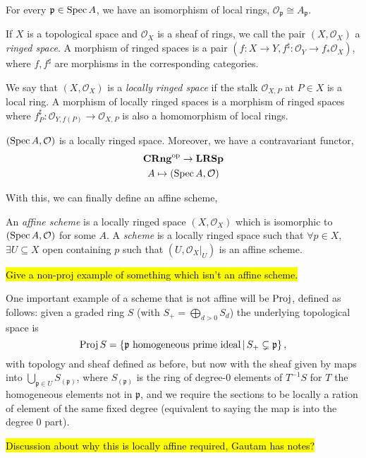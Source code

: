 \documentclass[000-main.tex]{subfiles}
\begin{document}
\begin{lemma}
  For every $\mathfrak{p}\in\operatorname{Spec} A$, we have an isomorphism of local rings, $\mathcal{O}_{\mathfrak{p}} \cong A_\mathfrak{p}$.
\end{lemma}

\begin{definition}
  If $X$ is a topological space and $\mathcal{O}_X$ is a sheaf of rings, we call the pair $(X, \mathcal{O}_X)$ a \emph{ringed space}.
  A morphism of ringed spaces is a pair $(f : X \to Y, f^\sharp : \mathcal{O}_Y \to f_\ast \mathcal{O}_X)$, where $f, f^\sharp$ are morphisms in the corresponding categories.
	
	We say that $(X, \mathcal{O}_X)$ is a \emph{locally ringed space} if the stalk $\mathcal{O}_{X, P}$ at $P \in X$ is a local ring.
  A morphism of locally ringed spaces is a morphism of ringed spaces where $f^\sharp_P : \mathcal{O}_{Y, f(P)} \to \mathcal{O}_{X, P}$ is also a homomorphism of local rings.
\end{definition}

\begin{example}
  $(\operatorname{Spec} A, \mathcal{O})$ is a locally ringed space.
  Moreover, we have a contravariant functor,
  \begin{displaymath}
    \begin{gathered}
      \mathbf{CRng}^{\text{op}} \to \mathbf{LRSp}\\
      A \mapsto (\operatorname{Spec} A , \mathcal{O})
    \end{gathered}
  \end{displaymath}
\end{example}

With this, we can finally define an affine scheme,
\begin{definition}
    An \emph{affine scheme} is a locally ringed space $(X, \mathcal{O}_X)$ which is isomorphic to $(\operatorname{Spec} A, \mathcal{O})$ for some $A$.
    A \emph{scheme} is a locally ringed space such that $\forall p \in X$, $\exists U \subseteq X$ open containing $p$ such that $(U, \left . \mathcal{O}_X \right \rvert_{U})$ is an affine scheme.
\end{definition}

\begin{example}
	\hl{Give a non-proj example of something which isn't an affine scheme.} 
\end{example}

One important example of a scheme that is not affine will be $\operatorname{Proj}$, defined as follows: given a graded ring $S$ (with $S_+ = \bigoplus_{d > 0 } S_d$) the underlying topological space is 
\[
\operatorname{Proj} S = \left \lbrace \mathfrak{p} \text{ homogeneous prime ideal} \, | \, S_+ \subsetneq \mathfrak{p} \right \rbrace ,  
\] 
with topology and sheaf defined as before, but now with the sheaf given by maps into $\bigcup_{\mathfrak{p} \in U} S_{(\mathfrak{p})}$, where $S_{(\mathfrak{p})}$ is the ring of degree-0 elements of $T^{-1}S$ for $T$ the homogeneous elements not in $\mathfrak{p}$, and we require the sections to be locally a ration of element of the same fixed degree (equivalent to saying the map is into the degree 0 part). 

\hl{Discussion about why this is locally affine required, Gautam has notes?} 
\end{document}
